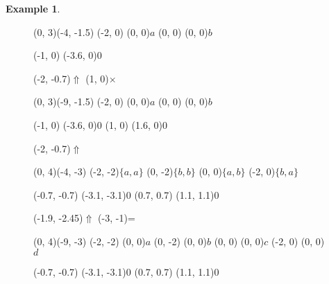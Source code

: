 \documentclass{article}
\theoremstyle{definition}
\newtheorem{example}[theorem]{Example}
\begin{document}
\begin{example}
\begin{figure}[t]
\begin{graph}(0, 3)(-4, -1.5)
  (-2, 0) (0, 0){$a$}
  (0, 0)  (0, 0){$b$}

  (-1, 0) \freetext(-3.6, 0){0}
   
   

  \freetext(-2, -0.7){$\Uparrow$}
  \freetext(1, 0){$\times$}
\end{graph}
\begin{graph}(0, 3)(-9, -1.5)
  (-2, 0) (0, 0){$a$}
  (0, 0)  (0, 0){$b$}

  (-1, 0) \freetext(-3.6, 0){0}
   
   
  (1, 0) \freetext(1.6, 0){0}

  \freetext(-2, -0.7){$\Uparrow$}
\end{graph}

\begin{graph}(0, 4)(-4, -3)
  (-2, -2){$\{a, a\}$}
  (0, -2){$\{b, b\}$}
  (0, 0){$\{a, b\}$}
  (-2, 0){$\{b, a\}$}

  (-0.7, -0.7) \freetext(-3.1, -3.1){0}
   
   
  (0.7, 0.7) \freetext(1.1, 1.1){0}
   
   

  \freetext(-1.9, -2.45){$\Uparrow$}
  \freetext(-3, -1){=}
\end{graph}
\begin{graph}(0, 4)(-9, -3)
  (-2, -2) (0, 0){$a$}
  (0, -2)  (0, 0){$b$}
  (0, 0) (0, 0){$c$}
  (-2, 0)  (0, 0){$d$}

  (-0.7, -0.7) \freetext(-3.1, -3.1){0}
   
   
  (0.7, 0.7) \freetext(1.1, 1.1){0}
   
   


\end{graph}
\end{figure}
\end{example}
\end{document}
